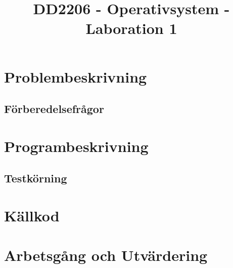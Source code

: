\documentclass[10pt,a4paper]{article}
\title{DD2206 - Operativsystem - Laboration 1}
\begin{document}
\maketitle


\section{Problembeskrivning}

\subsection{Förberedelsefrågor}

\section{Programbeskrivning}

\subsection{Testkörning}

\section{Källkod}

\section{Arbetsgång och Utvärdering}
\end{document}
